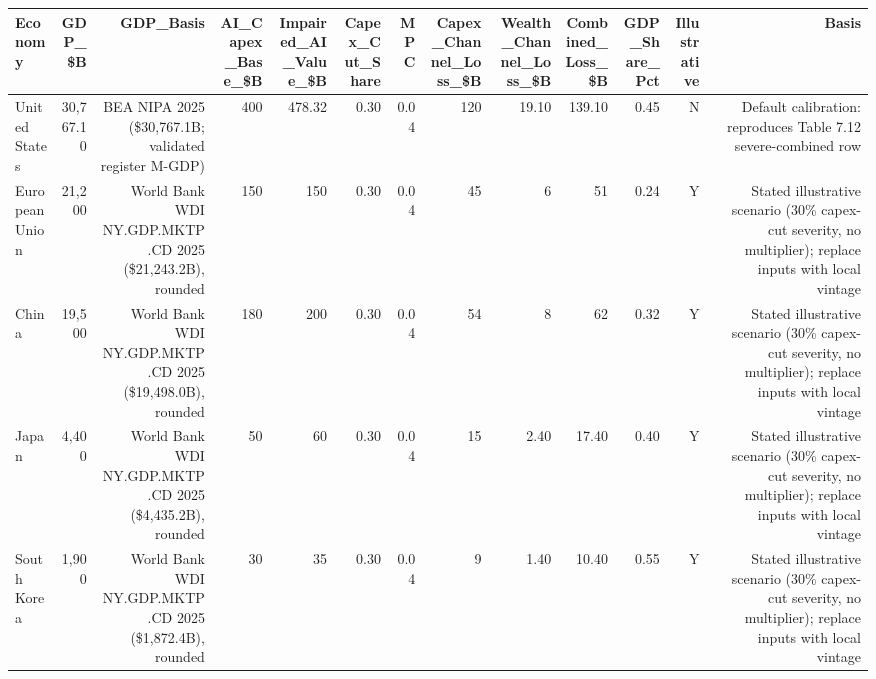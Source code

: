 

\begin{tabular}{@{}lrrrrrrrrrrrr@{}}
\toprule
Economy & GDP\_\$B & GDP\_Basis & AI\_Capex\_Base\_\$B & Impaired\_AI\_Value\_\$B & Capex\_Cut\_Share & MPC & Capex\_Channel\_Loss\_\$B & Wealth\_Channel\_Loss\_\$B & Combined\_Loss\_\$B & GDP\_Share\_Pct & Illustrative & Basis \\
\midrule
United States & 30,767.10 & BEA NIPA 2025 (\$30,767.1B; validated register M-GDP) & 400 & 478.32 & 0.30 & 0.04 & 120 & 19.10 & 139.10 & 0.45 & N & Default calibration: reproduces Table 7.12 severe-combined row \\
European Union & 21,200 & World Bank WDI NY.GDP.MKTP.CD 2025 (\$21,243.2B), rounded & 150 & 150 & 0.30 & 0.04 & 45 & 6 & 51 & 0.24 & Y & Stated illustrative scenario (30\% capex-cut severity, no multiplier); replace inputs with local vintage \\
China & 19,500 & World Bank WDI NY.GDP.MKTP.CD 2025 (\$19,498.0B), rounded & 180 & 200 & 0.30 & 0.04 & 54 & 8 & 62 & 0.32 & Y & Stated illustrative scenario (30\% capex-cut severity, no multiplier); replace inputs with local vintage \\
Japan & 4,400 & World Bank WDI NY.GDP.MKTP.CD 2025 (\$4,435.2B), rounded & 50 & 60 & 0.30 & 0.04 & 15 & 2.40 & 17.40 & 0.40 & Y & Stated illustrative scenario (30\% capex-cut severity, no multiplier); replace inputs with local vintage \\
South Korea & 1,900 & World Bank WDI NY.GDP.MKTP.CD 2025 (\$1,872.4B), rounded & 30 & 35 & 0.30 & 0.04 & 9 & 1.40 & 10.40 & 0.55 & Y & Stated illustrative scenario (30\% capex-cut severity, no multiplier); replace inputs with local vintage \\
\bottomrule
\end{tabular}